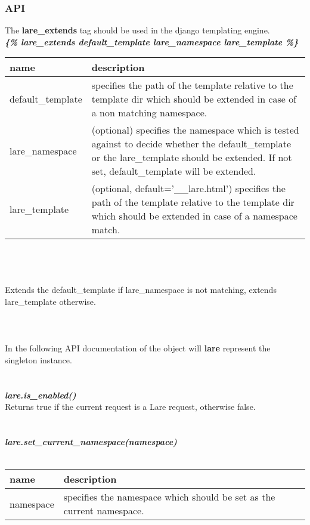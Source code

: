 \subsubsection{API}
The \textbf{lare\_extends} tag should be used in the django templating engine.
\\
\large{\textbf{\textit{\{\% lare\_extends default\_template lare\_namespace lare\_template \%\}}}}
\\
\begin{tabular}{|p{4cm}|p{9cm}|}
    \hline
    \textbf{name} & \textbf{description} \\
    \hline
    default\_template & specifies the path of the template relative to the template dir which should be extended in case of a non matching namespace. \\
    \hline
    lare\_namespace & (optional) specifies the namespace which is tested against to decide whether the default\_template or the lare\_template should be extended. If not set, default\_template will be extended. \\
    \hline
    lare\_template & (optional, default='\_\_lare.html') specifies the path of the template relative to the template dir which should be extended in case of a namespace match. \\
    \hline
\end{tabular}
\\
\\
\\
Extends the default\_template if lare\_namespace is not matching, extends lare\_template otherwise.
\\
\\
\\
\\
In the following API documentation of the \textbf{\lare{}} object will \textbf{lare} represent the singleton instance.
\\
\\
\\
\large{\textbf{\textit{lare.is\_enabled()}}}
\\
Returns true if the current request is a Lare request, otherwise false.
\\
\\
\\
\large{\textit{\textbf{lare.set\_current\_namespace(namespace)}}}
\\
\\
\begin{tabular}{|p{4cm}|p{9cm}|}
    \hline
    \textbf{name} & \textbf{description} \\
    \hline
    namespace & specifies the namespace which should be set as the current namespace. \\
    \hline
\end{tabular}
